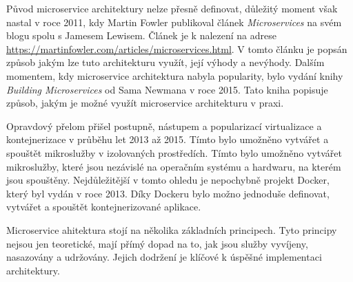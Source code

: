 
Původ microservice architektury nelze přesně definovat, důležitý moment však nastal v roce 2011, kdy Martin Fowler publikoval článek \textit{Microservices} na svém blogu spolu s Jamesem Lewisem. Článek je k nalezení na adrese \url{https://martinfowler.com/articles/microservices.html}. V tomto článku je popsán způsob jakým lze tuto architekturu využít, její výhody a nevýhody. Dalším momentem, kdy microservice architektura nabyla popularity, bylo vydání knihy \textit{Building Microservices} od Sama Newmana v roce 2015. Tato kniha popisuje způsob, jakým je možné využít microservice architekturu v praxi.

Opravdový přelom přišel postupně, nástupem a popularizací virtualizace a kontejnerizace v průběhu let 2013 až 2015. Tímto bylo umožněno vytvářet a spouštět mikroslužby v izolovaných prostředích. Tímto bylo umožněno vytvářet mikroslužby, které jsou nezávislé na operačním systému a hardwaru, na kterém jsou spouštěny. Nejdůležitější v tomto ohledu je nepochybně projekt Docker, který byl vydán v roce 2013. \cite{dockerdocs} Díky Dockeru bylo možno jednoduše definovat, vytvářet a spouštět kontejnerizované aplikace. 


Microservice ahitektura stojí na několika základních principech. Tyto principy nejsou jen teoretické, mají přímý dopad na to, jak jsou služby vyvíjeny, nasazovány a udržovány. Jejich dodržení je klíčové k úspěšné implementaci architektury. \cite{Richardson2018}

